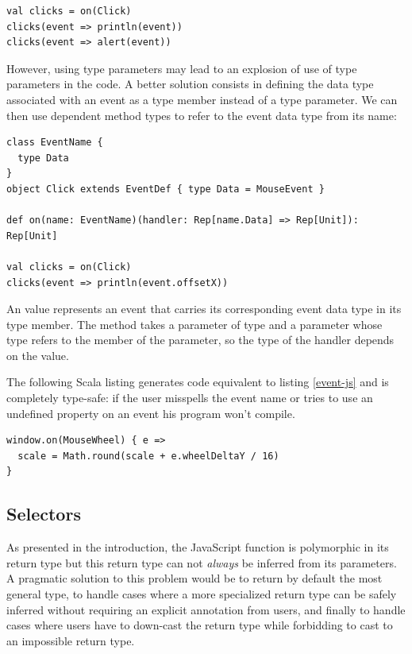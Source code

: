 \documentclass[runningheads,a4paper]{llncs}
\begin{document}
\begin{lstlisting}
val clicks = on(Click)
clicks(event => println(event))
clicks(event => alert(event))
\end{lstlisting}

However, using type parameters may lead to an explosion of use of type parameters in the code.
A better solution consists in defining the data type associated with an event as a type member
instead of a type parameter. We can then use dependent method types to refer to the event data type
from its name:

\begin{lstlisting}
class EventName {
  type Data
}
object Click extends EventDef { type Data = MouseEvent }

def on(name: EventName)(handler: Rep[name.Data] => Rep[Unit]): Rep[Unit]

val clicks = on(Click)
clicks(event => println(event.offsetX))
\end{lstlisting}

An  value represents an event that carries its corresponding event data type in its
 type member. The  method takes a parameter  of type 
and a  parameter whose type refers to the  member of the 
parameter, so the type of the handler depends on the  value.

The following Scala listing generates code equivalent to listing \ref{event-js} and is completely
type-safe: if the user misspells the event name or tries to use an undefined property on an event
his program won’t compile.

\begin{lstlisting}
window.on(MouseWheel) { e =>
  scale = Math.round(scale + e.wheelDeltaY / 16)
}
\end{lstlisting}

\subsection{Selectors}

As presented in the introduction, the JavaScript  function is polymorphic in
its return type but this return type can not \emph{always} be inferred from its parameters. A
pragmatic solution to this problem would be to return by default the most general type, to handle
cases where a more specialized return type can be safely inferred without requiring an explicit
annotation from users, and finally to handle cases where users have to down-cast the return type
while forbidding to cast to an impossible return type.
\end{document}
